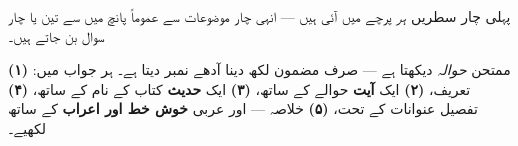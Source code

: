 \smallskip
\noindent
پہلی چار سطریں \emph{ہر} پرچے میں آئی ہیں --- انہی چار موضوعات سے عموماً پانچ
میں سے تین یا چار سوال بن جاتے ہیں۔

\medskip
\begin{nukta}
ممتحن \emph{حوالہ} دیکھتا ہے --- صرف مضمون لکھ دینا آدھے نمبر دیتا ہے۔ ہر
جواب میں: \textbf{(۱)} تعریف، \textbf{(۲)} ایک \textbf{آیت} حوالے کے ساتھ،
\textbf{(۳)} ایک \textbf{حدیث} کتاب کے نام کے ساتھ، \textbf{(۴)} تفصیل
عنوانات کے تحت، \textbf{(۵)} خلاصہ --- اور عربی \textbf{خوش خط اور اعراب} کے
ساتھ لکھیے۔
\end{nukta}
